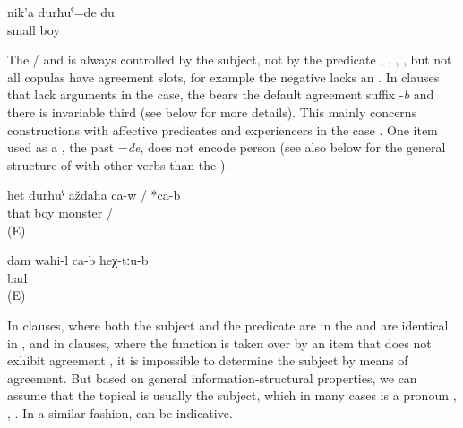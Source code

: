 \begin{exe}
	\ex	\label{ex:‎I was a little boy@A}
	\gll	nik'a	durħuˁ=de	du\\
		small	boy	\\
	\glt	{}
\end{exe}

The / and  is always controlled by the  subject, not by the predicate , ,  ,  , but not all copulas have  agreement slots, for example the negative  lacks an . In  clauses that lack arguments in the  case, the  bears the default agreement suffix -\textit{b} and there is invariable third  (see  below for more details). This mainly concerns  constructions with affective predicates and experiencers in the  case . One item used as a , the past  =\textit{de}, does not encode person  (see also  below for the general structure of  with other verbs than the ).

\begin{exe}
	\ex	\label{ex:‎‎‎That boy is a monster}
	\gll	het	durħuˁ	aždaha	ca-w	/ *ca-b\\
		that	boy	monster		/ \\
	\glt	{} (E)
	
	\ex	\label{ex:I feel(s) bad there}
	\gll	dam	wahi-l	ca-b	heχ-tːu-b\\
			bad		\\
	\glt	{} (E)	
	
\end{exe}


In  clauses, where both the subject and the predicate are in the  and are identical in  , and in  clauses, where the  function is taken over by an item that does not exhibit agreement , it is impossible to determine the  subject by means of agreement. But based on general information-structural properties, we can assume that the topical  is usually the subject, which in many cases is a pronoun , , . In a similar fashion,  can be indicative. 


